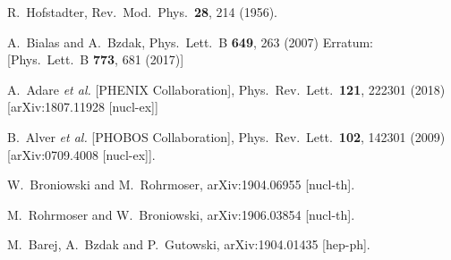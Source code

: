 \documentclass[a4paper,12pt]{article}
\begin{document}
\begin{thebibliography}{9}
  R.~Hofstadter,
  Rev.\ Mod.\ Phys.\  {\bf 28}, 214 (1956).

  A.~Bialas and A.~Bzdak,
  Phys.\ Lett.\ B {\bf 649}, 263 (2007)
  Erratum: [Phys.\ Lett.\ B {\bf 773}, 681 (2017)]

  A.~Adare {\it et al.} [PHENIX Collaboration],
  Phys.\ Rev.\ Lett.\ {\bf 121}, 222301 (2018) [arXiv:1807.11928 [nucl-ex]]

  B.~Alver {\it et al.} [PHOBOS Collaboration],
  Phys.\ Rev.\ Lett.\  {\bf 102}, 142301 (2009)
  [arXiv:0709.4008 [nucl-ex]].

  W.~Broniowski and M.~Rohrmoser,
  arXiv:1904.06955 [nucl-th].

  M.~Rohrmoser and W.~Broniowski,
  arXiv:1906.03854 [nucl-th].


  M.~Barej, A.~Bzdak and P.~Gutowski,
  arXiv:1904.01435 [hep-ph].




\end{thebibliography}
\end{document}

